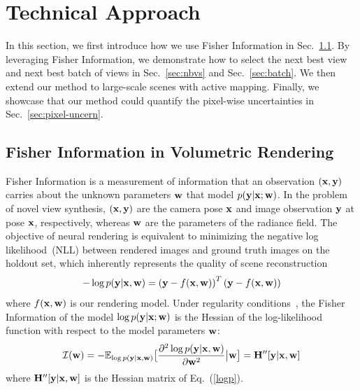 \section{Technical Approach} \label{sec:method}


In this section, we first introduce how we use Fisher Information in Sec.~\ref{sec:fisher-render}. By leveraging Fisher Information, we demonstrate how to select the next best view and next best batch of views in Sec.~\ref{sec:nbvs} and Sec.~\ref{sec:batch}. We then extend our method to large-scale scenes with active mapping. Finally, we showcase that our method could quantify the pixel-wise uncertainties in Sec.~\ref{sec:pixel-uncern}.
\subsection{Fisher Information in Volumetric Rendering}\label{sec:fisher-render}
Fisher Information is a measurement of information that an observation $({\bf x}, {\bf y})$ carries about the unknown parameters ${\bf w}$ that model $p({\bf y}|{\bf x}; {\bf w})$. In the problem of novel view synthesis,  $({\bf x}, {\bf y})$ are the camera pose ${\bf x}$ and image observation ${\bf y}$ at pose ${\bf x}$, respectively, whereas ${\bf w}$ are the parameters of the radiance field.
The objective of neural rendering is equivalent to minimizing the negative log likelihood~(NLL) between rendered images and ground truth images on the holdout set, which inherently represents the quality of scene reconstruction
\begin{equation}\label{logp}
   - \log p({\bf y}|{\bf x}, {\bf w}) = \left({\bf y} - f({\bf x}, {\bf w})\right)^T \left({\bf y} - f({\bf x}, {\bf w})\right)
\end{equation}
where $f({\bf x}, {\bf w})$ is our rendering model. 
Under regularity conditions~\cite{schervish2012theory}, the Fisher Information of the model $\log p({\bf y}|{\bf x}; {\bf w})$ is the Hessian of the log-likelihood function with respect to the model parameters ${\bf w}$:
\begin{equation}
     \mathcal{I}({\bf w}) = - \mathbb{E}_{\log p({\bf y}|{\bf x}, {\bf w})} \big[\frac{\partial^2 \log p({\bf y}|{\bf x}, {\bf w})}{\partial {\bf w}^2} \big| {\bf w} \big] = {\mathbf H}''[{\bf y}|{\bf x}, {\bf w}]
\end{equation}
where ${\mathbf H}''[{\bf y}|{\bf x}, {\bf w}]$ is the Hessian matrix of Eq.~(\ref{logp}).

